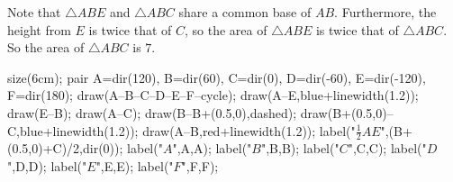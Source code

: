 Note that $\triangle{ABE}$ and $\triangle{ABC}$ share a common base of $AB$. Furthermore, the height from $E$ is twice that of $C$, so the area of $\triangle{ABE}$ is twice that of $\triangle{ABC}$. So the area of $\triangle{ABC}$ is $7$.
	\begin{center}
		\begin{asy}
			size(6cm);
			pair A=dir(120), B=dir(60), C=dir(0), D=dir(-60), E=dir(-120), F=dir(180);
			draw(A--B--C--D--E--F--cycle);
			draw(A--E,blue+linewidth(1.2)); draw(E--B); draw(A--C);
			draw(B--B+(0.5,0),dashed); draw(B+(0.5,0)--C,blue+linewidth(1.2));
			draw(A--B,red+linewidth(1.2));
			label("$\frac{1}{2}AE$",(B+(0.5,0)+C)/2,dir(0));
			label("$A$",A,A);
			label("$B$",B,B);
			label("$C$",C,C);
			label("$D$",D,D);
			label("$E$",E,E);
			label("$F$",F,F);
		\end{asy}
	\end{center}
